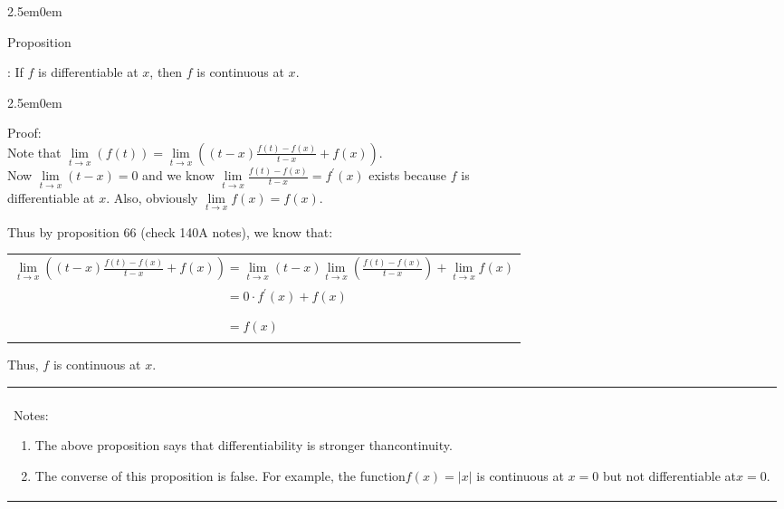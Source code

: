 \documentclass{book}
\newcommand{\hTwo}{%
   \color{MidnightBlue}%
   \fontsize{13}{15}\selectfont%
}
\newcommand{\hThree}{%
   \color{PineGreen!85!Orange}
   \fontsize{13}{15}\selectfont%
}
\newcommand{\teachComment}{
   \color{Orange}%
   \fontsize{12}{14}\selectfont%
}
\newenvironment{myIndent}{%
   \begin{adjustwidth}{2.5em}{0em}%
}{%
   \end{adjustwidth}%
}
\newcounter{PropNumber}
\newcommand{\propCount}[1][1]{%
   \addtocounter{PropNumber}{#1}%
   \thePropNumber%
}
\newenvironment{myClosureOne}[2][.]{%
   \color{#1}%
   \begin{tabular}{|p{#2in}|} \hline \\%
}{%
   \\ \hline \end{tabular}%
}
\newcommand{\retTwo}{\hfill\bigbreak}
\begin{document}
{\begin{myIndent}\hTwo
   Proposition \propCount: If $f$ is differentiable at $x$, then $f$ is continuous at $x$.\\ [-10pt]
   
   \begin{myIndent}\hThree
      Proof:\\
      Note that $\lim\limits_{t\rightarrow x}\left(f(t)\right) = \lim\limits_{t\rightarrow x}\left((t-x)\frac{f(t)-f(x)}{t-x} + f(x)\right)$.\\

      Now $\lim\limits_{t\rightarrow x}(t-x) = 0$ and we know $\lim\limits_{t\rightarrow x}\frac{f(t)-f(x)}{t-x} = f^\prime(x)$ exists because $f$ is\\ [3pt] differentiable at $x$. Also, obviously $\lim\limits_{t\rightarrow x}f(x) = f(x)$.\retTwo
      
      Thus by proposition 66 {\color{RawerSienna}(check 140A notes)}, we know that:\\
      
      \begin{tabular}{l}
         $\lim\limits_{t\rightarrow x}\left((t-x)\frac{f(t)-f(x)}{t-x} + f(x)\right) = \lim\limits_{t\rightarrow x}(t-x)\lim\limits_{t\rightarrow x}\left(\frac{f(t)-f(x)}{t-x}\right) + \lim\limits_{t\rightarrow x}f(x)$\\ [3pt]

         $\phantom{\lim\limits_{t\rightarrow x}\left((t-x)\frac{f(t)-f(x)}{t-x} + f(x)\right)} = 0\cdot f^\prime(x) + f(x)$ \\ [-4pt]
         $\phantom{\lim\limits_{t\rightarrow x}\left((t-x)\frac{f(t)-f(x)}{t-x} + f(x)\right)} = f(x)$
      \end{tabular}\retTwo

      Thus, $f$ is continuous at $x$.\retTwo
   \end{myIndent}
\end{myIndent}}


{\begin{center} \teachComment
   \begin{myClosureOne}{5}
      Notes:
      \begin{enumerate}
         \item The above proposition says that differentiability is stronger than\newline continuity.
         \item The converse of this proposition is false. For example, the function\newline $f(x) = |x|$ is continuous at $x = 0$ but not differentiable at\newline $x = 0$.
      \end{enumerate}
   \end{myClosureOne}
\end{center}}
\end{document}
